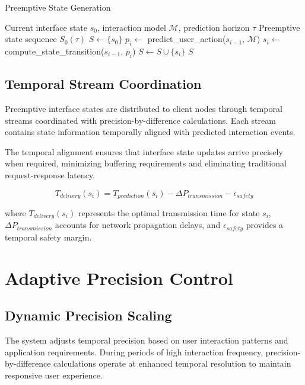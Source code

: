 \documentclass[12pt,a4paper]{article}
\begin{document}
\begin{algorithm}
\caption{Preemptive State Generation}
\begin{algorithmic}[1]
\Require Current interface state $s_0$, interaction model $\mathcal{M}$, prediction horizon $\tau$
\Ensure Preemptive state sequence $S_0(\tau)$
\State $S \leftarrow \{s_0\}$
    \State $p_i \leftarrow$ predict\_user\_action($s_{i-1}$, $\mathcal{M}$)
    \State $s_i \leftarrow$ compute\_state\_transition($s_{i-1}$, $p_i$)
    \State $S \leftarrow S \cup \{s_i\}$
\EndFor
\State \Return $S$
\end{algorithmic}
\end{algorithm}

\subsection{Temporal Stream Coordination}

Preemptive interface states are distributed to client nodes through temporal streams coordinated with precision-by-difference calculations. Each stream contains state information temporally aligned with predicted interaction events.

The temporal alignment ensures that interface state updates arrive precisely when required, minimizing buffering requirements and eliminating traditional request-response latency.

\begin{equation}
T_{delivery}(s_i) = T_{prediction}(s_i) - \Delta P_{transmission} - \epsilon_{safety}
\end{equation}

where $T_{delivery}(s_i)$ represents the optimal transmission time for state $s_i$, $\Delta P_{transmission}$ accounts for network propagation delays, and $\epsilon_{safety}$ provides a temporal safety margin.

\section{Adaptive Precision Control}

\subsection{Dynamic Precision Scaling}

The system adjusts temporal precision based on user interaction patterns and application requirements. During periods of high interaction frequency, precision-by-difference calculations operate at enhanced temporal resolution to maintain responsive user experience.
\end{document}
